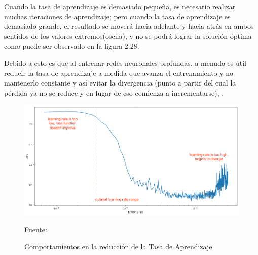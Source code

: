 		Cuando la tasa de aprendizaje es demasiado pequeña, es necesario realizar muchas iteraciones de aprendizaje; pero cuando la tasa de aprendizaje es demasiado grande, el resultado se moverá hacia adelante y hacia atrás en ambos sentidos de los valores extremos(oscila), y no se podrá lograr la solución óptima como puede ser observado en la figura 2.28.

		Debido a esto es que al entrenar redes neuronales profundas, a menudo es útil reducir la tasa de aprendizaje a medida que avanza el entrenamiento y no mantenerlo constante y así evitar la divergencia (punto a partir del cual la pérdida ya no se reduce y en lugar de eso comienza a incrementarse), \cite{AdamImg}.


		\begin{figure}[H]
		\includegraphics[width=1\textwidth]{images/desarrollo/entrenamiento/lr_finder}
		\begin{center}
		\caption{\small{Comportamientos en la reducción de la Tasa de Aprendizaje}}
		{\small{Fuente: \cite{AdamImg}}}
		\end{center}
		\vspace{-1.5em}
		\end{figure}

